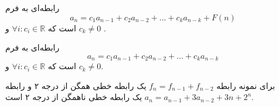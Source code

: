 \begin{DEFINITION}
    \p
    رابطه‌ای به فرم
   \[a_n=c_{1}a_{n-1}+c_{2}a_{n-2}+...+c_{k}a_{n-k}+F(n)\]
   است که
   $\forall{i}:c_i \in \mathbb{R} $
   و 
   $ c_k\neq 0$
.
\end{DEFINITION}

 \begin{DEFINITION}
    \p
    رابطه‌ای به فرم
   \[a_n=c_{1}a_{n-1}+c_{2}a_{n-2}+...+c_{k}a_{n-k}\]
   است که
   $\forall{i}:c_i \in \mathbb{R} $
   و 
   $ c_k\neq 0$.


\end{DEFINITION}

\p
برای نمونه رابطه‌ 
$f_n=f_{n-1}+f_{n-2}$
یک رابطه‌ خطی همگن از درجه ۲ و رابطه‌ 
$a_n=a_{n-1}+3a_{n-2}+3n+2^n$
یک رابطه‌ خطی ناهمگن از درجه ۲ است.

